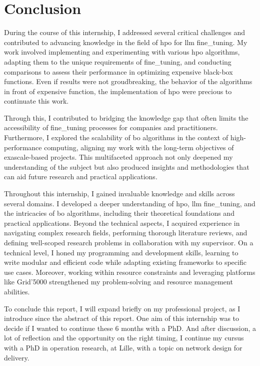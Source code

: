 \chapter*{Conclusion}
\label{chap:conclusion}



During the course of this internship, I addressed several critical challenges and contributed to advancing knowledge in the field of \acrlong{hpo} for \acrlong{llm} \gls{fine_tuning}. My work involved implementing and experimenting with various \acrlong{hpo} algorithms, adapting them to the unique requirements of \gls{fine_tuning}, and conducting comparisons to assess their performance in optimizing expensive black-box functions. Even if results were not groudbreaking, the behavior of the algorithms in front of expensive function, the implementation of \acrfull{hpo} were precious to continuate this work.

Through this, I contributed to bridging the knowledge gap that often limits the accessibility of \gls{fine_tuning} processes for companies and practitioners. Furthermore, I explored the scalability of \acrlong{bo} algorithms in the context of high-performance computing, aligning my work with the long-term objectives of exascale-based projects. This multifaceted approach not only deepened my understanding of the subject but also produced insights and methodologies that can aid future research and practical applications.


Throughout this internship, I gained invaluable knowledge and skills across several domains. I developed a deeper understanding of \acrlong{hpo}, \acrlong{llm} \gls{fine_tuning}, and the intricacies of \acrlong{bo} algorithms, including their theoretical foundations and practical applications. Beyond the technical aspects, I acquired experience in navigating complex research fields, performing thorough literature reviews, and defining well-scoped research problems in collaboration with my supervisor. On a technical level, I honed my programming and development skills, learning to write modular and efficient code while adapting existing frameworks to specific use cases. Moreover, working within resource constraints and leveraging platforms like Grid’5000 strengthened my problem-solving and resource management abilities. 

To conclude this report, I will expand briefly on my professional project, as I introduce since the abstract of this report. One aim of this internship was to decide if I wanted to continue these 6 months with a PhD. And after discussion, a lot of reflection and the opportunity on the right timing, I continue my cursus with a PhD in operation research, at Lille, with a topic on network design for delivery.


